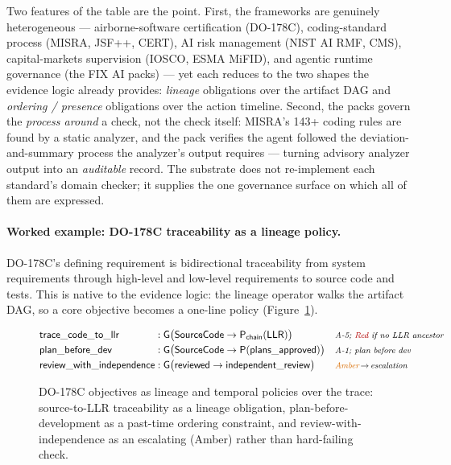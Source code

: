 Two features of the table are the point. First, the frameworks are genuinely heterogeneous --- airborne-software
certification (DO-178C), coding-standard process (MISRA, JSF++, CERT), AI risk management (NIST AI RMF, CMS),
capital-markets supervision (IOSCO, ESMA MiFID), and agentic runtime governance (the FIX AI packs) --- yet each
reduces to the two shapes the evidence logic already provides: \emph{lineage} obligations over the artifact DAG
and \emph{ordering / presence} obligations over the action timeline. Second, the packs govern the \emph{process
around} a check, not the check itself: MISRA's 143+ coding rules are found by a static analyzer, and the pack
verifies the agent followed the deviation-and-summary process the analyzer's output requires --- turning
advisory analyzer output into an \emph{auditable} record. The substrate does not re-implement each standard's
domain checker; it supplies the one governance surface on which all of them are expressed.

\paragraph{Worked example: DO-178C traceability as a lineage policy.} DO-178C's defining requirement is
bidirectional traceability from system requirements through high-level and low-level requirements to source
code and tests. This is native to the evidence logic: the  lineage operator walks the artifact
 DAG, so a core objective becomes a one-line policy (Figure~\ref{fig:ix-do178c}).

\begin{figure}[H]
\centering
\small
\[
\begin{array}{@{}l@{\;:\;}l@{\quad}l@{}}
\id{trace\_code\_to\_llr}      & \mathsf{G}\big(\id{SourceCode} \rightarrow \mathsf{P}_{\mathsf{chain}}(\id{LLR})\big) & \text{\footnotesize\itshape A-5; \textcolor{red!70!black}{Red} if no LLR ancestor}\\[3pt]
\id{plan\_before\_dev}         & \mathsf{G}\big(\id{SourceCode} \rightarrow \mathsf{P}(\id{plans\_approved})\big) & \text{\footnotesize\itshape A-1; plan before dev}\\[3pt]
\id{review\_with\_independence} & \mathsf{G}\big(\id{reviewed} \rightarrow \id{independent\_review}\big) & \text{\footnotesize\itshape \textcolor{orange!85!black}{Amber}\,$\to$\,escalation}
\end{array}
\]
\caption{DO-178C objectives as lineage and temporal policies over the trace: source-to-LLR traceability as a
 lineage obligation, plan-before-development as a past-time ordering constraint, and
review-with-independence as an escalating (Amber) rather than hard-failing check.}
\label{fig:ix-do178c}
\end{figure}

